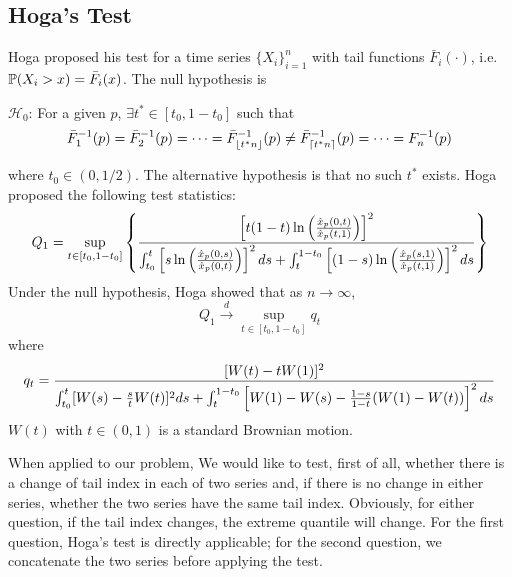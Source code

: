 \documentclass{article}
\begin{document}
\subsection{Hoga's Test}
Hoga \cite{Hoga2017} proposed his test for a time series
$\{X_i\}_{i=1}^n$ with tail functions
$\bar F_i(\cdot)$, i.e. $\P(X_i > x) = \bar F_i(x)$. The null
hypothesis is
\begin{hypothesis}
  $\mathcal H_0$: For a given $p$, $\exists t^* \in [t_0, 1 - t_0]$
  such that
  \[
  \bar F_1^{-1}(p) = \bar F_2^{-1}(p) = \cdots =
  \bar F_{\floor{t^* n}}^{-1}(p) \neq
  \bar F_{\ceil{t^* n}}^{-1}(p) = \cdots = F_n^{-1}(p)
  \]
\end{hypothesis}
where $t_0 \in (0, 1/2)$. The alternative hypothesis is that no such
$t^*$ exists. Hoga proposed the following test statistics:
\[
Q_1 = \sup_{t \in [t_0, 1 - t_0]}
\left\{
  {
    \left[
      t (1 - t) \ln\left(
      \hat x_p(0, t)
      \over
      \hat x_p(t, 1)
      \right)
    \right]^2
    \over
    \int_{t_0}^t
    \left[
      s \ln \left(
      \hat x_p(0, s)
      \over
      \hat x_p(0, t)
      \right)
    \right]^2 ds
    +
    \int_{t}^{1 - t_0}
    \left[
      (1 - s) \ln \left(
      \hat x_p(s, 1)
      \over
      \hat x_p(t, 1)
      \right)
    \right]^2 ds
  }
\right\}
\]
Under the null hypothesis, Hoga showed that as $n \to \infty$,
\begin{equation}
  \label{eq:Q1_distr}
  Q_1 \overset{d}{\to}
  \sup_{t \in [t_0, 1 - t_0]} q_t
\end{equation}
where
\[
q_t = 
  {
    [W(t) - t W(1)]^2
    \over
    \int_{t_0}^t [W(s) - {s \over t}W(t)]^2 ds
    +
    \int_{t}^{1 - t_0}
    \left[
      W(1) - W(s) - {1 - s \over 1 - t}
      (W(1) - W(t))
      \right]^2 ds
  }
\]
$W(t)$ with $t \in (0, 1)$ is a standard Brownian motion.

When applied to our problem, We would like to test, first of all,
whether there is a change of tail index in each of two 
series and, if there is no change in either series, whether the two
series have the same tail index. Obviously, for either question, if
the tail index changes, the extreme quantile will change.
For the first question, Hoga's test is directly applicable; for the
second question, we concatenate the two series before applying the
test.
\end{document}
